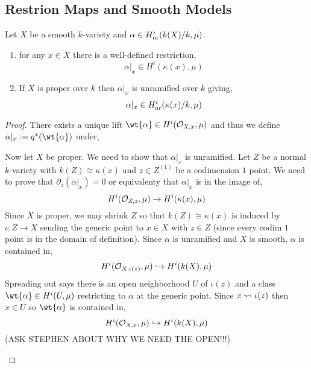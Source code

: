 \documentclass[12pt]{article}
\begin{document}
\subsection{Restrion Maps and Smooth Models}

\begin{prop}
Let $X$ be a smooth $k$-variety and $\alpha \in H_{\mathrm{nr}}^i(k(X)/k, \mu)$.
\begin{enumerate}
\item for any $x \in X$ there is a well-defined restriction,
\[ \alpha|_x \in H^i(\kappa(x), \mu) \]

\item If $X$ is proper over $k$ then $\alpha|_x$ is unramified over $k$ giving,
\[ \alpha|_x \in H^i_{\mathrm{nr}}(\kappa(x)/k, \mu) \]
\end{enumerate}
\end{prop}

\begin{proof}
There exists a unique lift $\wt{\alpha} \in H^i(\stalk{X}{x}, \mu)$ and thus we define $\alpha|_x := q^* (\wt{\alpha})$ under,
\begin{center}
\end{center}
Now let $X$ be proper. We need to show that $\alpha|_x$ is unramified. Let $Z$ be a normal $k$-variety with $k(Z) \cong \kappa(x)$ and $z \in Z^{(1)}$ be a codimension $1$ point. We need to prove that $\partial_z (\alpha|_x) = 0$ or equivalenty that $\alpha|_x$ is in the image of,
\[ H^i(\mathcal{O}_{Z, z}, \mu) \to H^i(\kappa(x), \mu) \]
Since $X$ is proper, we may shrink $Z$ so that $k(Z) \cong \kappa(x)$ is induced by $\iota : Z \to X$ sending the generic point to $x \in X$ with $z \in Z$ (since every codim $1$ point is in the domain of definition). Since $\alpha$ is unramified and $X$ is smooth, $\alpha$ is contained in,
\[ H^i(\mathcal{O}_{X, \iota(z)}, \mu) \hookrightarrow H^i(k(X), \mu) \]
Spreading out says there is an open neighborhood $U$ of $\iota(z)$ and a class $\wt{\alpha} \in H^i(U, \mu)$ restricting to $\alpha$ at the generic point. Since $x \rightsquigarrow \iota(z)$ then $x \in U$ so $\wt{\alpha}$ is contained in,
\[ H^i(\mathcal{O}_{X, x}, \mu) \hookrightarrow H^i(k(X), \mu) \] 
(ASK STEPHEN ABOUT WHY WE NEED THE OPEN!!!)
\begin{center}
\end{center}
\end{proof}
\end{document}

